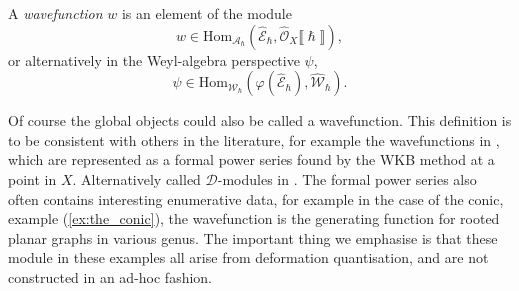     \begin{defn}[Wavefunction]
    A \emph{wavefunction} \(w\) is an element of the module 
    \[ w \in \mathrm{Hom}_{\mathcal{A}_{\hslash}} (\widehat{\mathcal{E}}_{\hslash},  \widehat{\mathcal{O}}_{X}\lBrack \hslash \rBrack ),\] 
    or alternatively in the Weyl-algebra perspective \( \psi\), 
    \[ \psi \in  \mathrm{Hom}_{\mathcal{W}_{\hslash}} (\varphi(\widehat{\mathcal{E}}_{\hslash}),  \widehat{\mathcal{W}}_{\hslash} ).\]
    \end{defn}

    
    
    Of course the global objects could also be called a wavefunction.  This definition is to be consistent with others in the literature, for example the wavefunctions in \cite[page 52]{ks_airy}, which are represented as a formal power series found by the WKB method at a point in \(X\). Alternatively called \( \mathcal{D}\)-modules in \cite[page 148]{holland}.
    The formal power series also often contains interesting enumerative data, for example in the case of the conic, example (\ref{ex:the_conic}), the wavefunction is the generating function for rooted planar graphs in various genus. The important thing we emphasise is that these module in these examples all arise from deformation quantisation, and are not constructed in an ad-hoc fashion.
    
